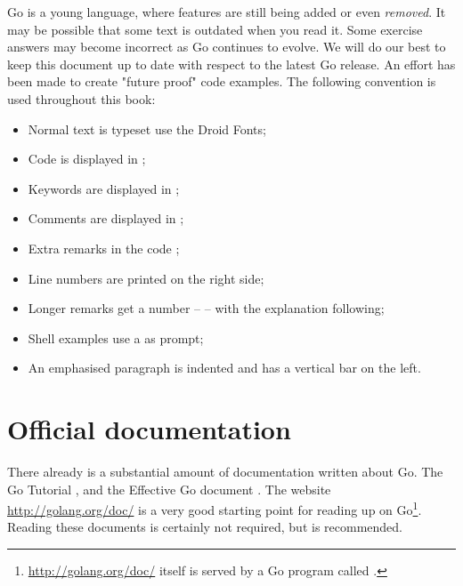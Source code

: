 Go is a young language, where 
features are still being added or even \emph{removed}. It 
may be possible that some text is outdated when you
read it. 
Some exercise answers may become incorrect as Go continues
to evolve.
We will do our best to keep this document up to 
date with respect to the latest Go release.
An effort has been made to create "future proof" code examples.
\noindent{}The following convention is used throughout this book:
\begin{itemize}
\item Normal text is typeset use the Droid Fonts;
\item Code is displayed in ;
\item Keywords are displayed in ;
\item Comments are displayed in ;
\item Extra remarks in the code ;
\item Line numbers are printed on the right side;
\item Longer remarks get a number --  -- with the explanation following;
\item Shell examples use a \pr{} as prompt;
\item An emphasised paragraph is indented and has a vertical bar on the
left.
\end{itemize}

\section{Official documentation}
There already is a substantial amount of documentation written about Go.
The Go Tutorial \cite{go_tutorial}, and the Effective Go
document \cite{effective_go}. The
website \url{http://golang.org/doc/} is a very good starting point
for reading up on Go\footnote{\url{http://golang.org/doc/} itself is served by 
a Go program called .}. Reading these documents is
certainly not required, but is recommended.

